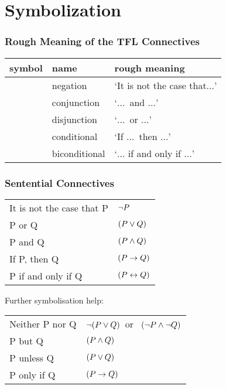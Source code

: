 \vspace*{2cm}
\section{Symbolization}
\subsubsection*{Rough Meaning of the TFL Connectives}
		\begin{tabular}{cll}
		\textbf{symbol}&\textbf{name}&\textbf{rough meaning}\\
		\hline
		\enot&negation&`It is not the case that$\ldots$'\\
		\eand&conjunction&`$\ldots$\ and $\ldots$'\\
		\eor&disjunction&`$\ldots$\ or $\ldots$'\\
		\eif&conditional&`If $\ldots$\ then $\ldots$'\\
		\eiff&biconditional&`$\ldots$ if and only if $\ldots$'\\
		\end{tabular}
		
		

\label{app.symbolization}
\subsubsection*{Sentential Connectives}
\begin{center}\begin{tabular*}{\textwidth}{ll}
It is not the case that P & $\neg P$\\
P or Q & $(P \vee Q)$\\
P and Q & $(P \mathbin{\wedge} Q)$\\
If P, then Q & $(P \rightarrow Q)$\\
P if and only if Q & $(P \leftrightarrow Q)$\\
\end{tabular*}\end{center}Further symbolisation help:\begin{center}
\begin{tabular*}{\textwidth}{ll}
Neither P nor Q & $\neg(P \vee Q)$\ or \ $(\neg P \mathbin{\wedge} \neg Q)$\\
P but Q & $(P \mathbin{\wedge} Q)$\\
P unless Q & $(P \vee Q)$\\
P only if Q & $(P \rightarrow Q)$
\end{tabular*}
\end{center}
